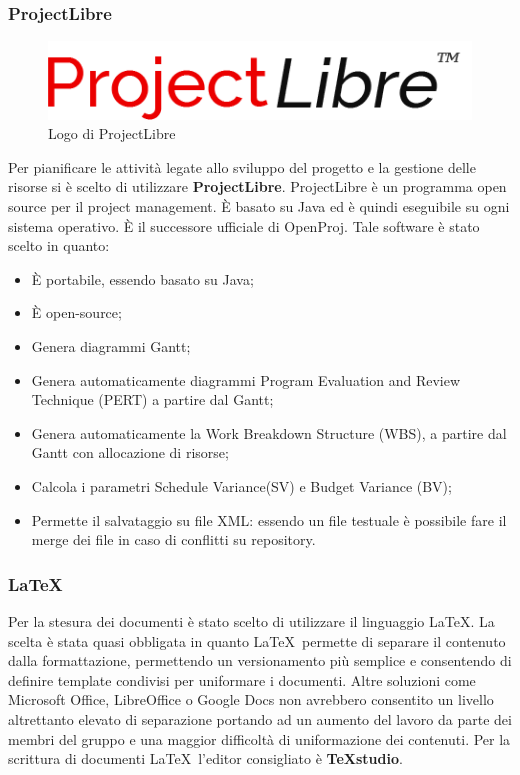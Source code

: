 \documentclass[../NormeDiProgetto.tex]{subfiles}
\begin{document}
			\subsubsection{ProjectLibre}
			\begin{figure} [h!]
				\centering
				\includegraphics[scale=0.3]{./Immagini/Libre.png}
				\caption{Logo di ProjectLibre}\label{}
			\end{figure}
				Per pianificare le attività legate allo sviluppo del progetto e la gestione delle risorse
				si è scelto di utilizzare \textbf{ProjectLibre}.
				ProjectLibre è un programma open source per il project management. È basato su Java ed è
				quindi eseguibile su ogni sistema operativo. È il successore ufficiale di OpenProj. Tale
				software è stato scelto in quanto:
				\begin{itemize}
					\item È portabile, essendo basato su Java;
					\item È open-source;
					\item Genera diagrammi Gantt;
					\item Genera automaticamente diagrammi Program Evaluation and Review Technique (PERT)
					a partire dal Gantt;
					\item Genera automaticamente la Work Breakdown Structure (WBS), a partire dal Gantt
					con allocazione di risorse;
					\item Calcola i parametri Schedule Variance(SV) e Budget Variance (BV);
					\item Permette il salvataggio su file XML: essendo un file testuale è possibile
					fare il merge dei file in caso di conflitti su repository. 
				\end{itemize}
			\subsubsection{\LaTeX}
				Per la stesura dei documenti è stato scelto di utilizzare il linguaggio \LaTeX.
				La scelta è stata quasi obbligata in quanto \LaTeX\ permette di separare il contenuto dalla
				formattazione, permettendo un versionamento più semplice e consentendo di definire template condivisi per uniformare i documenti. Altre soluzioni come Microsoft Office, LibreOffice o
				Google Docs non avrebbero consentito un livello altrettanto elevato di separazione portando
				ad un aumento del lavoro da parte dei membri del gruppo e una maggior difficoltà di
				uniformazione dei contenuti.
				Per la scrittura di documenti \LaTeX\ l'editor consigliato è \textbf{TeXstudio}.
\end{document}

